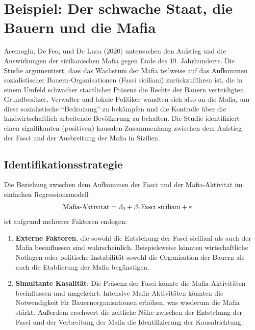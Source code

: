 \documentclass[
  a4paper,
  DIV=11,
  oneside]{scrreprt}
\begin{document}
\section{Beispiel: Der schwache Staat, die Bauern und die
Mafia}\label{beispiel-der-schwache-staat-die-bauern-und-die-mafia}

Acemoglu, De Feo, und De Luca (2020) untersuchen den Aufstieg und die
Auswirkungen der sizilianischen Mafia gegen Ende des 19. Jahrhunderts.
Die Studie argumentiert, dass das Wachstum der Mafia teilweise auf das
Aufkommen sozialistischer Bauern-Organisationen (Fasci siciliani)
zurückzuführen ist, die in einem Umfeld schwacher staatlicher Präsenz
die Rechte der Bauern verteidigten. Grundbesitzer, Verwalter und lokale
Politiker wandten sich also an die Mafia, um diese sozialistische
``Bedrohung'' zu bekämpfen und die Kontrolle über die landwirtschaftlich
arbeitende Bevölkerung zu behalten. Die Studie identifiziert einen
signifikanten (positiven) kausalen Zusammenhang zwischen dem Aufstieg
der Fasci und der Ausbreitung der Mafia in Sizilien.

\subsection{Identifikationsstrategie}\label{identifikationsstrategie}

Die Beziehung zwischen dem Aufkommen der Fasci und der Mafia-Aktivität
im einfachen Regressionsmodell \begin{align}
  \textup{Mafia-Aktivität} = \beta_0 + \beta_1 \textup{Fasci siciliani} + \varepsilon \label{eq:fascimafiamod1}
\end{align} ist aufgrund mehrerer Faktoren endogen:

\begin{enumerate}
\def\labelenumi{\arabic{enumi}.}
\item
  \textbf{Externe Faktoren}, die sowohl die Entstehung der Fasci
  siciliani als auch der Mafia beeinflussen sind wahrscheinlich.
  Beispielsweise könnten wirtschaftliche Notlagen oder politische
  Instabilität sowohl die Organisation der Bauern als auch die
  Etablierung der Mafia begünstigen.
\item
  \textbf{Simultante Kasalität}: Die Präsenz der Fasci könnte die
  Mafia-Aktivitäten beeinflussen und umgekehrt: Intensive
  Mafia-Aktivitäten könnten die Notwendigkeit für Bauernorganisationen
  erhöhen, was wiederum die Mafia stärkt. Außerdem erschwert die
  zeitliche Nähe zwischen der Entstehung der Fasci und der Verbreitung
  der Mafia die Identifizierung der Kausalrichtung.
\end{enumerate}
\end{document}
